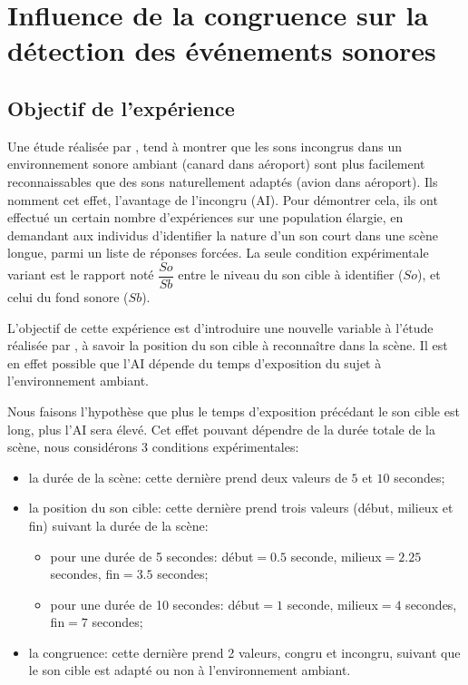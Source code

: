 \chapter[Expérience annexe: congruence]{Influence de la congruence sur la détection des événements sonores}
\label{app:xp_congruence}


\section{Objectif de l'expérience}

Une étude réalisée par \citep{gygi2011incongruency}, tend à montrer que les sons incongrus dans un environnement sonore ambiant (canard dans aéroport) sont plus facilement reconnaissables que des sons naturellement adaptés (avion dans aéroport). Ils nomment cet effet, l'avantage de l'incongru (AI). Pour démontrer cela, ils ont effectué un certain nombre d’expériences sur une population élargie, en demandant aux individus d’identifier la nature d’un son court dans une scène longue, parmi un liste de réponses forcées. La seule condition expérimentale variant est le rapport noté $\dfrac{So}{Sb}$ entre le niveau du son cible à identifier ($So$), et celui du fond sonore ($Sb$).

L'objectif de cette expérience est d'introduire une nouvelle variable à l'étude réalisée par \citep{gygi2011incongruency}, à savoir la position du son cible à reconnaître dans la scène. Il est en effet possible que l'AI dépende du temps d'exposition du sujet à l'environnement ambiant. 

Nous faisons l'hypothèse que plus le temps d'exposition précédant le son cible est long, plus l'AI sera élevé. Cet effet pouvant dépendre de la durée totale de la scène, nous considérons 3 conditions expérimentales:

\begin{itemize}
\item la durée de la scène: cette dernière prend deux valeurs de $5$ et $10$ secondes;
\item la position du son cible: cette dernière prend trois valeurs (début, milieux et fin) suivant la durée de la scène:

\begin{itemize}
\item pour une durée de 5 secondes: début$=0.5$ seconde, milieux$=2.25$ secondes, fin$=3.5$ secondes;
\item pour une durée de 10 secondes: début$=1$ seconde, milieux$=4$ secondes, fin$=7$ secondes;
\end{itemize}

\item la congruence: cette dernière prend 2 valeurs, congru et incongru, suivant que le son cible est adapté ou non à l'environnement ambiant.
\end{itemize}

